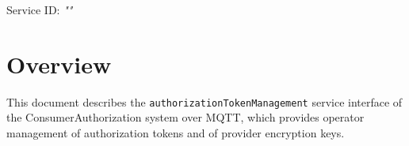 \documentclass[a4paper]{arrowhead}
\begin{document}
\sloppy

\ArrowheadSetup

\begin{center}
  \vspace*{1cm}
  \huge{\arrowtitle}

  \vspace*{0.2cm}
  \LARGE{\arrowtype}
  \vspace*{1cm}

  \Large{Service ID: \textit{"\arrowid"}}

  \vspace*{\fill}


  \vspace*{1cm}
  \vspace*{\fill}

  \begin{abstract}
    This document describes the MQTT protocol with TLS payload security and JSON payload encoding variant of the \texttt{authorization\allowbreak{}Token\allowbreak{}Management} service of the ConsumerAuthorization system.
  \end{abstract}

  \vspace*{1cm}
\end{center}

\newpage

\tableofcontents
\newpage

\section{Overview}
\label{sec:overview}

This document describes the \texttt{authorization\allowbreak{}Token\allowbreak{}Management} service interface of the ConsumerAuthorization system over MQTT, which provides operator management of authorization tokens and of provider encryption keys.
\end{document}
